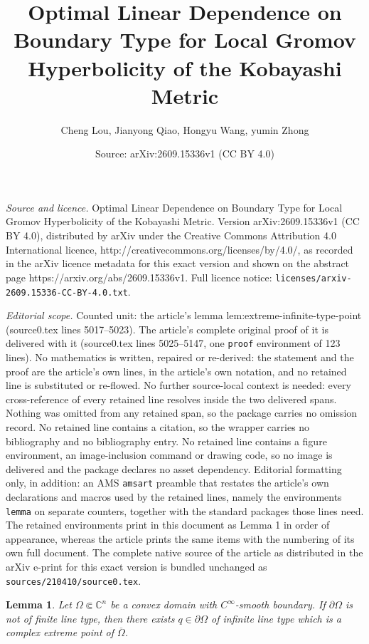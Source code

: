 \documentclass[10pt,a4paper]{amsart}
\title{Optimal Linear Dependence on Boundary Type for Local Gromov Hyperbolicity of the Kobayashi Metric}
\author{Cheng Lou, Jianyong Qiao, Hongyu Wang, yumin Zhong}
\date{Source: arXiv:2609.15336v1 (CC BY 4.0)}
\newtheorem{lemma}{Lemma}
\newcommand{\C}{\mathbb{C}}
\begin{document}
\maketitle

\noindent\emph{Source and licence.} Optimal Linear Dependence on Boundary Type for Local Gromov Hyperbolicity of the Kobayashi Metric. Version arXiv:2609.15336v1 (CC BY 4.0), distributed by arXiv under the Creative Commons Attribution 4.0 International licence, http://creativecommons.org/licenses/by/4.0/, as recorded in the arXiv licence metadata for this exact version and shown on the abstract page https://arxiv.org/abs/2609.15336v1. Full licence notice: \texttt{licenses/arxiv-2609.15336-CC-BY-4.0.txt}.\par\smallskip

\noindent\textit{Editorial scope.} Counted unit: the article's lemma lem:extreme-infinite-type-point (source0.tex lines 5017--5023). The article's complete original proof of it is delivered with it (source0.tex lines 5025--5147, one \texttt{proof} environment of 123 lines). No mathematics is written, repaired or re-derived: the statement and the proof are the article's own lines, in the article's own notation, and no retained line is substituted or re-flowed.  No further source-local context is needed: every cross-reference of every retained line resolves inside the two delivered spans.  Nothing was omitted from any retained span, so the package carries no omission record.  No retained line contains a citation, so the wrapper carries no bibliography and no bibliography entry.  No retained line contains a figure environment, an image-inclusion command or drawing code, so no image is delivered and the package declares no asset dependency.  Editorial formatting only, in addition: an AMS \texttt{amsart} preamble that restates the article's own declarations and macros used by the retained lines, namely the environments \texttt{lemma} on separate counters, together with the standard packages those lines need.  The retained environments print in this document as Lemma 1 in order of appearance, whereas the article prints the same items with the numbering of its own full document.  The complete native source of the article as distributed in the arXiv e-print for this exact version is bundled unchanged as \texttt{sources/210410/source0.tex}.
\begin{lemma}
	\label{lem:extreme-infinite-type-point}
	Let \(\Omega\Subset\C^n\) be a convex domain with \(C^\infty\)-smooth
	boundary.  If \(\partial\Omega\) is not of finite line type, then there
	exists \(q\in\partial\Omega\) of infinite line type which is a complex
	extreme point of \(\overline\Omega\).
\end{lemma}
\end{document}

